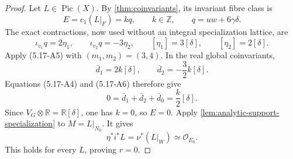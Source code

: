 \begin{proof}
Let \(L\in\operatorname{Pic}(X)\).  By
\cref{thm:coinvariants}, its invariant fibre class is
\[
 E=c_1(L|_F)=kq,
 \qquad k\in\mathbb Z,
 \qquad q=uw+6\gamma\delta.
\tag{5.17-A35}
\]
The exact contractions, now used without an integral specialization
lattice, are
\[
 \iota_{v_1}q=2\eta_1,
 \qquad
 \iota_{v_2}q=-3\eta_2,
 \qquad
 [\eta_1]=3[\delta],
 \qquad
 [\eta_2]=2[\delta].
\tag{5.17-A36}
\]
Apply (5.17-A5) with \((m_1,m_2)=(3,4)\).  In the real global
coinvariants,
\[
 \bar d_1=2k[\delta],
 \qquad
 \bar d_2=-\frac32k[\delta].
\tag{5.17-A37}
\]
Equations (5.17-A4) and (5.17-A6) therefore give
\[
 0=\bar d_1+\bar d_2+\bar d_0
   =\frac{k}{2}[\delta].
\tag{5.17-A38}
\]
Since \(V_G\otimes\mathbb R=\mathbb R[\delta]\), one has \(k=0\), so
\(E=0\).  Apply \cref{lem:analytic-support-specialization} to
\(M=L|_{N_0}\).  It gives
\[
 \eta^*i^*L=\nu^*(L|_W)\simeq\mathcal O_{E_0}.
\]
This holds for every \(L\), proving \(r=0\).
\end{proof}
